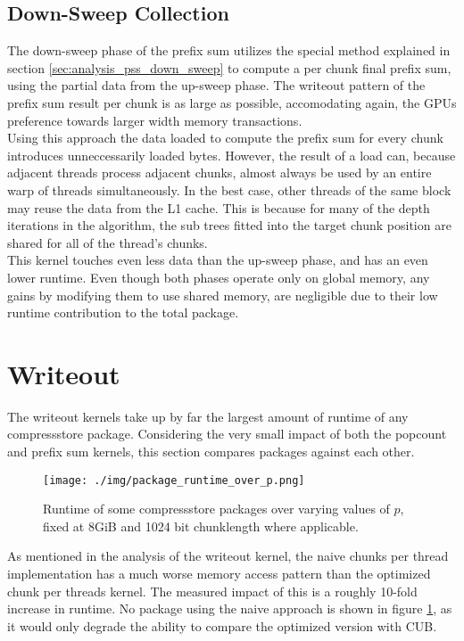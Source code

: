 \documentclass{tudscrreprt}
\begin{document}
			\subsection{Down-Sweep Collection}
				The down-sweep phase of the prefix sum utilizes the special method explained in section \ref{sec:analysis_pss_down_sweep} to compute a per chunk final prefix sum, using the partial data from the up-sweep phase. The writeout pattern of the prefix sum result per chunk is as large as possible, accomodating again, the GPUs preference towards larger width memory transactions. \\
				Using this approach the data loaded to compute the prefix sum for every chunk introduces unneccessarily loaded bytes. However, the result of a load can, because adjacent threads process adjacent chunks, almost always be used by an entire warp of threads simultaneously. In the best case, other threads of the same block may reuse the data from the L1 cache. This is because for many of the depth iterations in the algorithm, the sub trees fitted into the target chunk position are shared for all of the thread's chunks. \\
				
				This kernel touches even less data than the up-sweep phase, and has an even lower runtime. Even though both phases operate only on global memory, any gains by modifying them to use shared memory, are negligible due to their low runtime contribution to the total package.
		
		\section{Writeout}
			The writeout kernels take up by far the largest amount of runtime of any compressstore package. Considering the very small impact of both the popcount and prefix sum kernels, this section compares packages against each other.
		
			\begin{figure}[!ht]
				\centering
				\texttt{[image: ./img/package\_runtime\_over\_p.png]}
				\caption{\label{fig:package_runtime_over_p}Runtime of some compressstore packages over varying values of $p$, fixed at 8GiB and 1024 bit chunklength where applicable.}
			\end{figure}
			
			As mentioned in the analysis of the writeout kernel, the naive chunks per thread implementation has a much worse memory access pattern than the optimized chunk per threads kernel. The measured impact of this is a roughly 10-fold increase in runtime. No package using the naive approach is shown in figure \ref{fig:package_runtime_over_p}, as it would only degrade the ability to compare the optimized version with CUB. \\
			
\end{document}
